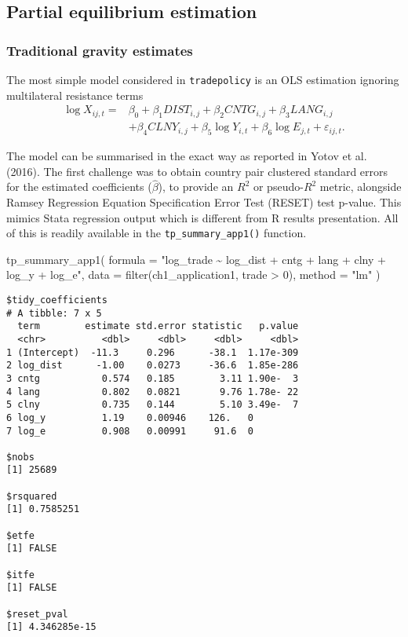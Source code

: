 \documentclass[12pt,reqno,oneside,pdftex]{formato-puc/puctesis} %
\newenvironment{Shaded}{\begin{snugshade}}{\end{snugshade}}
\newcommand{\AttributeTok}[1]{\textcolor[rgb]{0.77,0.63,0.00}{#1}}
\newcommand{\DecValTok}[1]{\textcolor[rgb]{0.00,0.00,0.81}{#1}}
\newcommand{\FunctionTok}[1]{\textcolor[rgb]{0.00,0.00,0.00}{#1}}
\newcommand{\NormalTok}[1]{#1}
\newcommand{\SpecialCharTok}[1]{\textcolor[rgb]{0.00,0.00,0.00}{#1}}
\newcommand{\StringTok}[1]{\textcolor[rgb]{0.31,0.60,0.02}{#1}}
\begin{document}
\hypertarget{partial-equilibrium-estimation}{%
\subsection{Partial equilibrium
estimation}\label{partial-equilibrium-estimation}}

\hypertarget{traditional-gravity-estimates}{%
\subsubsection{Traditional gravity
estimates}\label{traditional-gravity-estimates}}

The most simple model considered in \texttt{tradepolicy} is an OLS
estimation ignoring multilateral resistance terms \begin{align*}
\log X_{ij,t} =& \beta_0 + \beta_1 DIST_{i,j} + \beta_2 CNTG_{i,j} + \beta_3 LANG_{i,j}\\ 
\text{ }& + \beta_4 CLNY_{i,j} + \beta_5 \log Y_{i,t} + \beta_6 \log E_{j,t} + \varepsilon_{ij,t}.
\end{align*}

The model can be summarised in the exact way as reported in Yotov et al.
(2016). The first challenge was to obtain country pair clustered
standard errors for the estimated coefficients (\(\hat{\beta}\)), to
provide an \(R^2\) or pseudo-\(R^2\) metric, alongside Ramsey Regression
Equation Specification Error Test (RESET) test p-value. This mimics
Stata regression output which is different from R results presentation.
All of this is readily available in the \texttt{tp\_summary\_app1()}
function.

\begin{Shaded}
\begin{Highlighting}[]
\FunctionTok{tp\_summary\_app1}\NormalTok{(}
  \AttributeTok{formula =} \StringTok{"log\_trade \textasciitilde{} log\_dist + cntg + lang + clny + log\_y + log\_e"}\NormalTok{,}
  \AttributeTok{data =} \FunctionTok{filter}\NormalTok{(ch1\_application1, trade }\SpecialCharTok{\textgreater{}} \DecValTok{0}\NormalTok{),}
  \AttributeTok{method =} \StringTok{"lm"}
\NormalTok{)}
\end{Highlighting}
\end{Shaded}

\begin{verbatim}
$tidy_coefficients
# A tibble: 7 x 5
  term        estimate std.error statistic   p.value
  <chr>          <dbl>     <dbl>     <dbl>     <dbl>
1 (Intercept)  -11.3     0.296      -38.1  1.17e-309
2 log_dist      -1.00    0.0273     -36.6  1.85e-286
3 cntg           0.574   0.185        3.11 1.90e-  3
4 lang           0.802   0.0821       9.76 1.78e- 22
5 clny           0.735   0.144        5.10 3.49e-  7
6 log_y          1.19    0.00946    126.   0        
7 log_e          0.908   0.00991     91.6  0        

$nobs
[1] 25689

$rsquared
[1] 0.7585251

$etfe
[1] FALSE

$itfe
[1] FALSE

$reset_pval
[1] 4.346285e-15
\end{verbatim}
\end{document}
